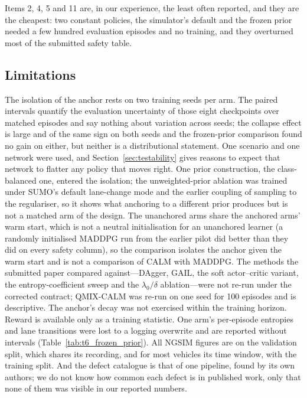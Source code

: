 Items 2, 4, 5 and 11 are, in our experience, the least often reported, and they are the cheapest: two constant policies, the simulator's default and the frozen prior needed a few hundred evaluation episodes and no training, and they overturned most of the submitted safety table.

\subsection{Limitations}
\label{sec:disc_limits}

The isolation of the anchor rests on two training seeds per arm. The paired intervals quantify the evaluation uncertainty of those eight checkpoints over matched episodes and say nothing about variation across seeds; the collapse effect is large and of the same sign on both seeds and the frozen-prior comparison found no gain on either, but neither is a distributional statement. One scenario and one network were used, and Section~\ref{sec:testability} gives reasons to expect that network to flatter any policy that moves right. One prior construction, the class-balanced one, entered the isolation; the unweighted-prior ablation was trained under SUMO's default lane-change mode and the earlier coupling of sampling to the regulariser, so it shows what anchoring to a different prior produces but is not a matched arm of the design. The unanchored arms share the anchored arms' warm start, which is not a neutral initialisation for an unanchored learner (a randomly initialised MADDPG run from the earlier pilot did better than they did on every safety column), so the comparison isolates the anchor given the warm start and is not a comparison of CALM with MADDPG. The methods the submitted paper compared against---DAgger, GAIL, the soft actor--critic variant, the entropy-coefficient sweep and the $\lambda_0/\delta$ ablation---were not re-run under the corrected contract; QMIX-CALM was re-run on one seed for 100 episodes and is descriptive. The anchor's decay was not exercised within the training horizon. Reward is available only as a training statistic. One arm's per-episode entropies and lane transitions were lost to a logging overwrite and are reported without intervals (Table~\ref{tab:t6_frozen_prior}). All NGSIM figures are on the validation split, which shares its recording, and for most vehicles its time window, with the training split. And the defect catalogue is that of one pipeline, found by its own authors; we do not know how common each defect is in published work, only that none of them was visible in our reported numbers.
